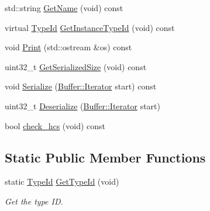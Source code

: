 \begin{DoxyCompactItemize}
\item 
std\+::string \hyperlink{classns3_1_1BandwidthRequestHeader_a53f82865e8cb2115921fed17d0982644}{Get\+Name} (void) const 
\item 
virtual \hyperlink{classns3_1_1TypeId}{Type\+Id} \hyperlink{classns3_1_1BandwidthRequestHeader_a95f73631b603238b5b4f37763363bd83}{Get\+Instance\+Type\+Id} (void) const 
\item 
void \hyperlink{classns3_1_1BandwidthRequestHeader_a57b70fb7f29956dede9e848a24d8edb9}{Print} (std\+::ostream \&os) const 
\item 
uint32\+\_\+t \hyperlink{classns3_1_1BandwidthRequestHeader_aacdb41e163b0cedb61b2abdf705c9b3e}{Get\+Serialized\+Size} (void) const 
\item 
void \hyperlink{classns3_1_1BandwidthRequestHeader_a0a14347ab5e5b165cfd52db3c018edf6}{Serialize} (\hyperlink{classns3_1_1Buffer_1_1Iterator}{Buffer\+::\+Iterator} start) const 
\item 
uint32\+\_\+t \hyperlink{classns3_1_1BandwidthRequestHeader_a12a0c737b169d284852dfdf65f422e51}{Deserialize} (\hyperlink{classns3_1_1Buffer_1_1Iterator}{Buffer\+::\+Iterator} start)
\item 
bool \hyperlink{classns3_1_1BandwidthRequestHeader_ade8bb691fdd8ec033ecb499e477f3eae}{check\+\_\+hcs} (void) const 
\end{DoxyCompactItemize}
\subsection*{Static Public Member Functions}
\begin{DoxyCompactItemize}
\item 
static \hyperlink{classns3_1_1TypeId}{Type\+Id} \hyperlink{classns3_1_1BandwidthRequestHeader_ade5e9d6b9e16b50afa91434fff206713}{Get\+Type\+Id} (void)
\begin{DoxyCompactList}\small\item\em Get the type ID. \end{DoxyCompactList}\end{DoxyCompactItemize}
